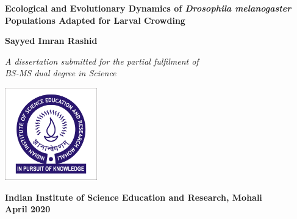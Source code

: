 \begin{titlepage}
  \begin{center}
    \LARGE
    \textbf{Ecological and Evolutionary Dynamics of \textit{Drosophila melanogaster} Populations Adapted for Larval Crowding}

    \vspace{1.5cm}
    \Large
    \textbf{Sayyed Imran Rashid}

    \vfill
    \Large
    \textit{A dissertation submitted for the partial fulfilment of\\
    BS-MS dual degree in Science}

    \vspace{0.8cm}

    \includegraphics[width=0.3\textwidth]{IISER_Mohali_logo.jpg}

    \large
    \textbf{Indian Institute of Science Education and Research, Mohali}\\
    \large
    \textbf{April 2020}
  \end{center}
\end{titlepage}
